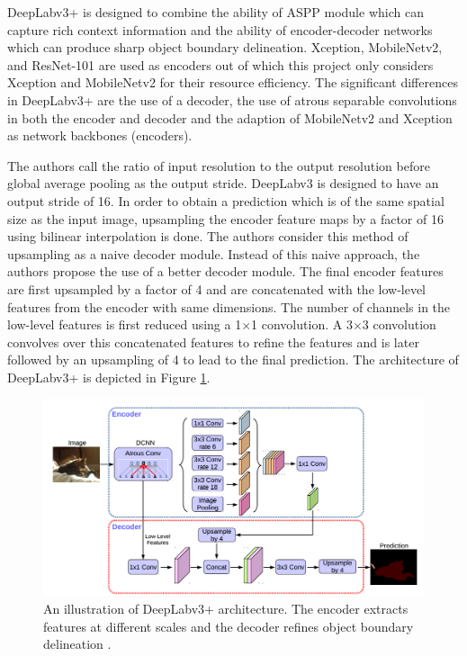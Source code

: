 DeepLabv3+ is designed to combine the ability of ASPP module which can capture rich context information and the ability of encoder-decoder networks which can produce sharp object boundary delineation. Xception, MobileNetv2, and ResNet-101 are used as encoders out of which this project only considers Xception and MobileNetv2 for their resource efficiency. The significant differences in DeepLabv3+ are the use of a decoder, the use of atrous separable convolutions in both the encoder and decoder and the adaption of MobileNetv2 and Xception as network backbones (encoders).

The authors call the ratio of input resolution to the output resolution before global average pooling as the output stride. DeepLabv3 is designed to have an output stride of 16. In order to obtain a prediction which is of the same spatial size as the input image, upsampling the encoder feature maps by a factor of 16  using bilinear interpolation is done. The authors consider this method of upsampling as a naive decoder module. Instead of this naive approach, the authors propose the use of a better decoder module. The final encoder features are first upsampled by a factor of 4 and are concatenated with the low-level features from the encoder with same dimensions. The number of channels in the low-level features is first reduced using a 1$\times$1 convolution. A 3$\times$3 convolution convolves over this concatenated features to refine the features and is later followed by an upsampling of 4 to lead to the final prediction. The architecture of DeepLabv3+ is depicted in Figure \ref{Fig:deepLabv4}.

	\begin{figure}
		\centering
		\includegraphics[width=1\linewidth]{images/deepLabv4}
		\caption{An illustration of DeepLabv3+ architecture. The encoder extracts features at different scales and the decoder refines object boundary delineation \cite{DBLP:journals/corr/abs-1802-02611}.}
		\label{Fig:deepLabv4}
	\end{figure}

